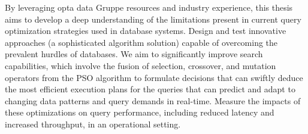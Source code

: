 By leveraging opta data Gruppe resources and industry experience, this thesis aims to develop a deep understanding of the limitations present in current query optimization strategies used in database systems. Design and test innovative approaches (a sophisticated algorithm solution) capable of overcoming the prevalent hurdles of databases. We aim to significantly improve search capabilities, which involve the fusion of selection, crossover, and mutation operators from the PSO algorithm to formulate decisions that can swiftly deduce the most efficient execution plans for the queries that can predict and adapt to changing data patterns and query demands in real-time. Measure the impacts of these optimizations on query performance, including reduced latency and increased throughput, in an operational setting. \vspace{.4cm}










